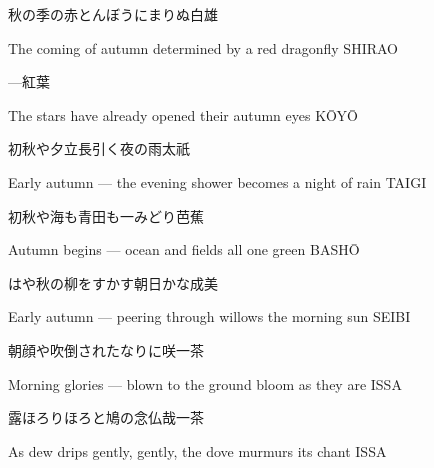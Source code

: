 \begin{haiku}
    {\FH 秋の季の赤とんぼうにまりぬ}\hfill{\FH 白雄}

    \vin{} The coming of autumn
    \vin{} \vin{} determined
    \vin{} \vin{} \vin{} by a red dragonfly \hspace{\fill} SHIRAO
\end{haiku}

\begin{haiku}
    {---}\hfill{\FH 紅葉}

    \vin{} The stars
    \vin{} \vin{} have already opened
    \vin{} \vin{} \vin{} their autumn eyes \hspace{\fill} K\={O}Y\={O}
\end{haiku}

\begin{haiku}
    {\FH 初秋や夕立長引く夜の雨}\hfill{\FH 太祇}

    \vin{} Early autumn ---
    \vin{} \vin{} the evening shower becomes
    \vin{} \vin{} \vin{} a night of rain \hspace{\fill} TAIGI
\end{haiku}

\begin{haiku}
    {\FH 初秋や海も青田も一みどり}\hfill{\FH 芭蕉}

    \vin{} Autumn begins ---
    \vin{} \vin{} ocean and fields
    \vin{} \vin{} \vin{} all one green \hspace{\fill} BASH\={O}
\end{haiku}

\begin{haiku}
    {\FH はや秋の柳をすかす朝日かな}\hfill{\FH 成美}

    \vin{} Early autumn ---
    \vin{} \vin{} peering through willows
    \vin{} \vin{} \vin{} the morning sun \hspace{\fill} SEIBI
\end{haiku}

\begin{haiku}
    {\FH 朝顔や吹倒されたなりに咲}\hfill{\FH 一茶}

    \vin{} Morning glories ---
    \vin{} \vin{} blown to the ground
    \vin{} \vin{} \vin{} bloom as they are \hspace{\fill} ISSA
\end{haiku}

\begin{haiku}
    {\FH 露ほろりほろと鳩の念仏哉}\hfill{\FH 一茶}

    \vin{} As dew drips
    \vin{} \vin{} gently, gently, the dove
    \vin{} \vin{} \vin{} murmurs its chant \hspace{\fill} ISSA
\end{haiku}

